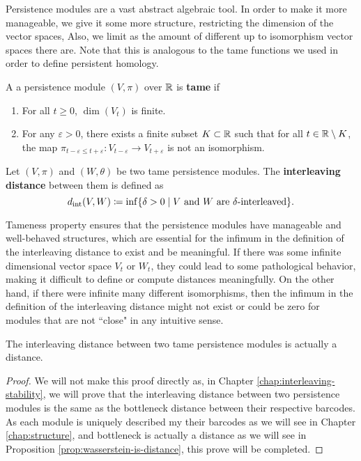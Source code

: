 Persistence modules are a vast abstract algebraic tool. In order to make it more manageable, we give it some more structure, restricting the dimension of the vector spaces, Also, we limit as the amount of different up to isomorphism vector spaces there are. Note that this is analogous to the tame functions we used in order to define persistent homology.

\begin{definition}
    A a persistence module $ (V, \pi) $ over $ \mathbb R $ is {\bf tame} if
    \begin{enumerate}
        \renewcommand{\labelenumi}{(\roman{enumi})}
        \item For all $ t \geq 0 $, $ \dim(V_t) $ is finite.
        \item For any $\varepsilon > 0 $, there exists a finite subset $ K \subset \mathbb R $ such that for all $ t \in \mathbb R \setminus K $, the map $ \pi_{t-\varepsilon \leq t+\varepsilon} \colon V_{t-\varepsilon} \to V_{t+\varepsilon} $ is not an isomorphism.
    \end{enumerate}
\end{definition}

\begin{definition} \label{def:interleaving-distance}
    Let $ (V, \pi) $ and $ (W, \theta) $ be two tame persistence modules. The {\bf interleaving distance} between them is defined as
    \begin{equation}
        d_{\operatorname{int}}(V, W) \coloneq \inf \{ \delta > 0 \mid V \text{ and } W \text{ are } \delta\text{-interleaved}\}.
    \end{equation}
\end{definition}

Tameness property ensures that the persistence modules have manageable and well-behaved structures, which are essential for the infimum in the definition of the interleaving distance to exist and be meaningful. If there was some infinite dimensional vector space $ V_t $ or $ W_t$, they could lead to some pathological behavior, making it difficult to define or compute distances meaningfully. On the other hand, if there were infinite many different isomorphisms, then the infimum in the definition of the interleaving distance might not exist or could be zero for modules that are not ``close" in any intuitive sense.

\begin{proposition}
    The interleaving distance between two tame persistence modules is actually a distance.
\end{proposition}
\begin{proof}
    We will not make this proof directly as, in Chapter \ref{chap:interleaving-stability}, we will prove that the interleaving distance between two persistence modules is the same as the bottleneck distance between their respective barcodes. As each module is uniquely described my their barcodes as we will see in Chapter \ref{chap:structure}, and bottleneck is actually a distance as we will see in Proposition \ref{prop:wasserstein-is-distance}, this prove will be completed.
\end{proof}  

